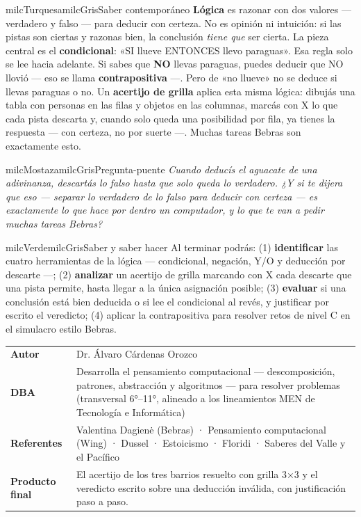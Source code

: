 \documentclass[11pt,letterpaper]{article}
\begin{document}
\begin{softbox}{milcTurquesa}{milcGris}{Saber contemporáneo}
\textbf{Lógica} es razonar con dos valores --- verdadero y falso --- para deducir con certeza. No es opinión ni intuición: si las pistas son ciertas y razonas bien, la conclusión \emph{tiene que} ser cierta. La pieza central es el \textbf{condicional}: «SI llueve ENTONCES llevo paraguas». Esa regla solo se lee hacia adelante. Si sabes que \textbf{NO} llevas paraguas, puedes deducir que NO llovió --- eso se llama \textbf{contrapositiva} ---. Pero de «no llueve» no se deduce si llevas paraguas o no. Un \textbf{acertijo de grilla} aplica esta misma lógica: dibujás una tabla con personas en las filas y objetos en las columnas, marcás con X lo que cada pista descarta y, cuando solo queda una posibilidad por fila, ya tienes la respuesta --- con certeza, no por suerte ---. Muchas tareas Bebras son exactamente esto.
\end{softbox}

\begin{softbox}{milcMostaza}{milcGris}{Pregunta-puente}
\textit{Cuando deducís el aguacate de una adivinanza, descartás lo falso hasta que solo queda lo verdadero. ¿Y si te dijera que eso --- separar lo verdadero de lo falso para deducir con certeza --- es exactamente lo que hace por dentro un computador, y lo que te van a pedir muchas tareas Bebras?}
\end{softbox}

\begin{softbox}{milcVerde}{milcGris}{Saber y saber hacer}
Al terminar podrás: (1) \textbf{identificar} las cuatro herramientas de la lógica --- condicional, negación, Y/O y deducción por descarte ---; (2) \textbf{analizar} un acertijo de grilla marcando con X cada descarte que una pista permite, hasta llegar a la única asignación posible; (3) \textbf{evaluar} si una conclusión está bien deducida o si lee el condicional al revés, y justificar por escrito el veredicto; (4) aplicar la contrapositiva para resolver retos de nivel C en el simulacro estilo Bebras.
\end{softbox}



\small
\begin{tabularx}{\textwidth}{>{\bfseries}p{3.0cm}Y}
Autor & Dr. Álvaro Cárdenas Orozco\\
DBA & Desarrolla el pensamiento computacional --- descomposición, patrones, abstracción y algoritmos --- para resolver problemas (transversal 6°--11°, alineado a los lineamientos MEN de Tecnología e Informática)\\
Referentes & Valentina Dagienė (Bebras) · Pensamiento computacional (Wing) · Dussel · Estoicismo · Floridi · Saberes del Valle y el Pacífico\\
Producto final & El acertijo de los tres barrios resuelto con grilla 3×3 y el veredicto escrito sobre una deducción inválida, con justificación paso a paso.\\
\end{tabularx}
\normalsize
\end{document}
